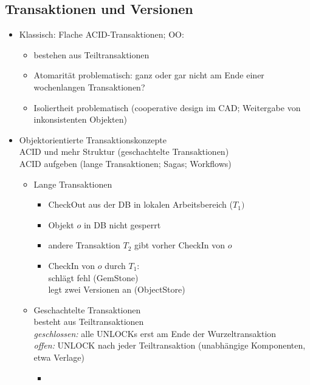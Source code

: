 \subsection{Transaktionen und Versionen}
\begin{itemize}
	\item Klassisch: Flache ACID-Transaktionen; OO:
	\begin{itemize}
		\item bestehen aus Teiltransaktionen
		\item Atomarität problematisch: ganz oder gar nicht am Ende einer wochenlangen Transaktionen?
		\item Isoliertheit problematisch (cooperative design im CAD; Weitergabe von inkonsistenten Objekten)
	\end{itemize}
	\item Objektorientierte Transaktionskonzepte\\
	ACID und mehr Struktur (geschachtelte Transaktionen)\\
	ACID aufgeben (lange Transaktionen; Sagas; Workflows)
	\begin{itemize}
		\item Lange Transaktionen
		\begin{itemize}
			\item CheckOut aus der DB in lokalen Arbeitsbereich ($T_1)$
			\item Objekt $o$ in DB nicht gesperrt
			\item andere Transaktion $T_2$ gibt vorher CheckIn von $o$ 
			\item CheckIn von $o$ durch $T_1$:\\
			schlägt fehl (GemStone)\\
			legt zwei Versionen an (ObjectStore)
		\end{itemize}
		\item Geschachtelte Transaktionen\\
		besteht aus Teiltransaktionen\\
		\textit{geschlossen:} alle UNLOCKs erst am Ende der Wurzeltransaktion\\
		\textit{offen:} UNLOCK nach jeder Teiltransaktion (unabhängige Komponenten, etwa Verlage)
		\begin{itemize}
			\item 
		\end{itemize}


\end{itemize}
\end{itemize}
